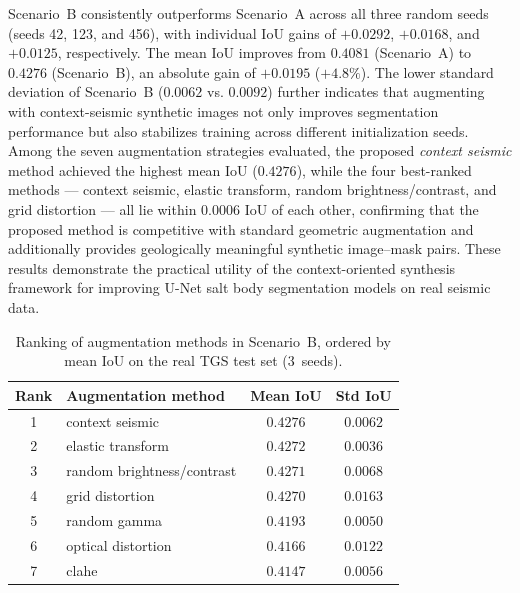 \documentclass{ieeeaccess}
\begin{document}
Scenario~B consistently outperforms Scenario~A across all three random seeds (seeds 42, 123, and 456), with individual IoU gains of $+0.0292$, $+0.0168$, and $+0.0125$, respectively. The mean IoU improves from $0.4081$ (Scenario~A) to $0.4276$ (Scenario~B), an absolute gain of $+0.0195$ ($+4.8\%$). The lower standard deviation of Scenario~B ($0.0062$ vs. $0.0092$) further indicates that augmenting with context-seismic synthetic images not only improves segmentation performance but also stabilizes training across different initialization seeds. Among the seven augmentation strategies evaluated, the proposed \emph{context seismic} method achieved the highest mean IoU ($0.4276$), while the four best-ranked methods — context seismic, elastic transform, random brightness/contrast, and grid distortion — all lie within $0.0006$ IoU of each other, confirming that the proposed method is competitive with standard geometric augmentation and additionally provides geologically meaningful synthetic image--mask pairs. These results demonstrate the practical utility of the context-oriented synthesis framework for improving U-Net salt body segmentation models on real seismic data.

\begin{table}[htbp]
    \centering
    \caption{Ranking of augmentation methods in Scenario~B, ordered by mean IoU on the real TGS test set (3~seeds).}
    \label{tab:downstream_augments}
    \footnotesize
    \begin{tabular}{clcc}
        \toprule
        \textbf{Rank} & \textbf{Augmentation method} & \textbf{Mean IoU} & \textbf{Std IoU} \\
        \midrule
        1 & context seismic & $\mathbf{0.4276}$ & $0.0062$ \\
        2 & elastic transform & $0.4272$ & $0.0036$ \\
        3 & random brightness/contrast & $0.4271$ & $0.0068$ \\
        4 & grid distortion & $0.4270$ & $0.0163$ \\
        5 & random gamma & $0.4193$ & $0.0050$ \\
        6 & optical distortion & $0.4166$ & $0.0122$ \\
        7 & clahe & $0.4147$ & $0.0056$ \\
        \bottomrule
    \end{tabular}
\end{table}
\end{document}
